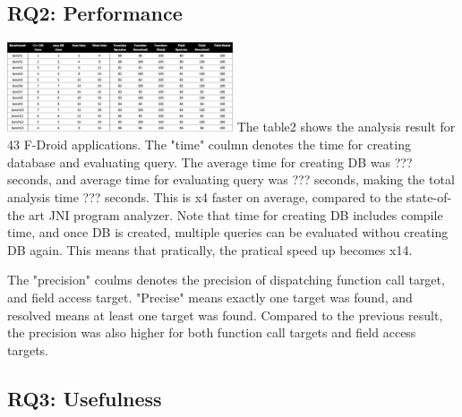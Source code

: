 \subsection{RQ2: Performance}
\includegraphics[width=0.5\textwidth]{img/table2}
The table2 shows the analysis result for 43 F-Droid applications. The "time" coulmn denotes
the time for creating database and evaluating query. The average time for creating DB was
??? seconds, and average time for evaluating query was ??? seconds, making the total analysis time
??? seconds. This is x4 faster on average, compared to the state-of-the art JNI program analyzer.
Note that time for creating DB includes compile time, and once DB is created, multiple queries can
be evaluated withou creating DB again. This means that pratically, the pratical speed up becomes x14.

The "precision" coulms denotes the precision of dispatching function call target, and field access target.
"Precise" means exactly one target was found, and resolved means at least one target was found.
Compared to the previous result, the precision was also higher for both function call targets and field access targets.

\subsection{RQ3: Usefulness}

